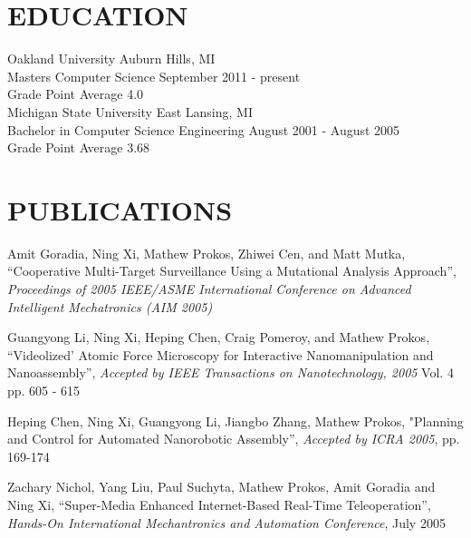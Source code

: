 \documentclass[line]{res}
\begin{document}
\begin{resume}
\section{EDUCATION} 
   \vspace{1mm}
   Oakland University \hfill Auburn Hills, MI\\
   Masters Computer Science \hfill September 2011 - present\\
   Grade Point Average 4.0\\

  \vspace{-5mm}
   Michigan State University \hfill East Lansing, MI\\
   Bachelor in Computer Science Engineering \hfill August 2001 - August 2005\\
   Grade Point Average 3.68\\


\section{PUBLICATIONS} 
\vspace{1mm}
   Amit Goradia, Ning Xi, Mathew Prokos, Zhiwei Cen, and Matt Mutka,
   ``Cooperative Multi-Target Surveillance Using a Mutational Analysis Approach'',
   \textsl{Proceedings of 2005 IEEE/ASME International Conference on
      Advanced Intelligent Mechatronics (AIM 2005)}

   \vspace{-2mm}
   Guangyong Li, Ning Xi, Heping Chen, Craig Pomeroy, and Mathew Prokos,
   ``Videolized' Atomic Force Microscopy for Interactive Nanomanipulation and Nanoassembly'',
   \textsl{Accepted by IEEE Transactions on Nanotechnology, 2005} Vol. 4 pp. 605 - 615

   \vspace{-2mm}
   Heping Chen, Ning Xi, Guangyong Li, Jiangbo Zhang, Mathew Prokos,
   "Planning and Control for Automated Nanorobotic Assembly'',
   \textsl{Accepted by ICRA 2005}, pp. 169-174

   \vspace{-2mm}
   Zachary Nichol, Yang Liu, Paul Suchyta, Mathew Prokos, Amit Goradia and Ning Xi, 
   ``Super-Media Enhanced Internet-Based Real-Time Teleoperation'',
   \textsl{Hands-On International Mechantronics and Automation Conference}, July 2005
\end{resume}
\end{document}
